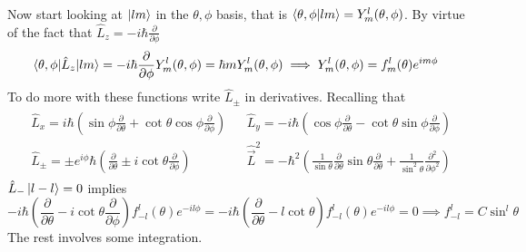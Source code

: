 \documentclass{article}
\begin{document}
Now start looking at $\ket{lm}$ in the $\theta,\phi$ basis, that is $\braket{\theta,\phi|lm} = Y_{m}^l(\theta,\phi)$. By virtue of the fact that $\hat{L}_z = -i\hbar \frac{\partial}{\partial \phi}$
\begin{equation*} \braket{\theta, \phi| \hat{L}_z |lm} = -i\hbar \frac{\partial}{\partial \phi} Y_{m}^l (\theta, \phi) = \hbar m Y_{m}^l (\theta, \phi) \implies Y_{m}^l(\theta, \phi) = f_m^l(\theta) e^{im\phi} \end{equation*}
To do more with these functions write $\hat{L}_{\pm}$ in derivatives. Recalling that 
\begin{align*} \begin{aligned} & \hat{L}_x = i\hbar(\sin\phi \frac{\partial}{\partial \theta} + \cot\theta\cos\phi\frac{\partial}{\partial \phi}) && \hat{L}_y = -i\hbar(\cos\phi\frac{\partial}{\partial \theta} - \cot\theta\sin\phi\frac{\partial}{\partial \phi}) \\
&\hat{L}_{\pm} = \pm e^{i\phi}\hbar(\frac{\partial}{\partial \theta} \pm i\cot\theta\frac{\partial}{\partial \phi}) && \hat{\vec{L}}^2 = -\hbar^2(\frac{1}{\sin\theta} \frac{\partial}{\partial \theta} \sin\theta \frac{\partial}{\partial \theta} + \frac{1}{\sin^2\theta}\frac{\partial^2}{\partial \phi^2})
\end{aligned}\end{align*}
$\hat{L}_-\ket{l-l} = 0$ implies 
\begin{equation*}
-i\hbar(\frac{\partial}{\partial \theta} - i\cot\theta \frac{\partial}{\partial \phi}) f_{-l}^l(\theta)e^{-il\phi} = -i\hbar(\frac{\partial}{\partial \theta} - l\cot\theta)f_{-l}^l(\theta)e^{-il\phi} = 0 \implies f_{-l}^l = C\sin^l\theta  
\end{equation*}
The rest involves some integration.
\end{document}
